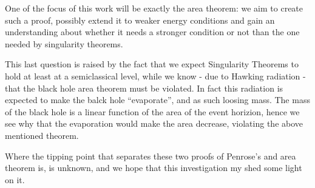 \documentclass[12pt, a4paper]{article}
\begin{document}
One of the focus of this work will be exactly the area theorem: we aim to create such a proof, possibly extend it to weaker energy conditions and gain an understanding about whether it needs a stronger condition or not than the one needed by singularity theorems.

This last question is raised by the fact that we expect Singularity Theorems to hold at least at a semiclassical level, while we know - due to Hawking radiation - that the black hole area theorem must be violated. 
In fact this radiation is expected to make the balck hole ``evaporate'', and as such loosing mass. The mass of the black hole is a linear function of the area of the event horizion, hence we see why that the evaporation would make the area decrease, violating the above mentioned theorem.

Where the tipping point that separates these two proofs of Penrose's and area theorem is, is unknown, and we hope that this investigation my shed some light on it.



\clearpage

\printbibliography
\end{document}
